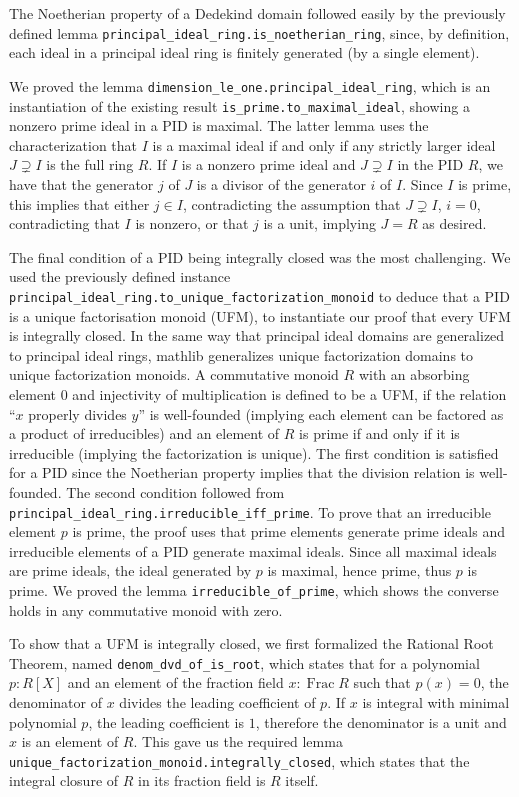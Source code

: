 \documentclass[a4paper,USenglish,cleveref, autoref, thm-restate]{lipics-v2021}
\newcommand{\lean}[1]{\texttt{#1}\xspace}
\newcommand{\mathlib}{\textsf{mathlib}\xspace}
\DeclareMathOperator{\Frac}{Frac}
\begin{document}
The Noetherian property of a Dedekind domain followed easily by the previously defined lemma \lean{principal\_ideal\_ring.is\_noetherian\_ring}, since, by definition, each ideal in a principal ideal ring is finitely generated (by a single element).

We proved the lemma \lean{dimension\_le\_one.principal\_ideal\_ring}, which is an instantiation of the existing result \lean{is\_prime.to\_maximal\_ideal}, showing a nonzero prime ideal in a PID is maximal.
The latter lemma uses the characterization that $I$ is a maximal ideal if and only if any strictly larger ideal $J\supsetneq I$ is the full ring $R$.
If $I$ is a nonzero prime ideal and $J \supsetneq I$ in the PID $R$, we have that the generator $j$ of $J$ is a divisor of the generator $i$ of $I$. Since $I$ is prime, this implies that either $j \in I$, contradicting the assumption that $J \supsetneq I$, $i = 0$, contradicting that $I$ is nonzero, or that $j$ is a unit, implying $J = R$ as desired.

The final condition of a PID being integrally closed was the most challenging.
We used the previously defined instance \lean{principal\_ideal\_ring.to\_unique\_factorization\_monoid} to deduce that a PID is a unique factorisation monoid (UFM),
to instantiate our proof that every UFM is integrally closed.
In the same way that principal ideal domains are generalized to principal ideal rings, \mathlib generalizes unique factorization domains to unique factorization monoids.
A commutative monoid $R$ with an absorbing element $0$ and injectivity of multiplication is defined to be a UFM,
if the relation ``$x$ properly divides $y$'' is well-founded (implying each element can be factored as a product of irreducibles) and
an element of $R$ is prime if and only if it is irreducible (implying the factorization is unique).
The first condition is satisfied for a PID since the Noetherian property implies that the division relation is well-founded.
The second condition followed from \lean{principal\_ideal\_ring.irreducible\_iff\_prime}.
To prove that an irreducible element $p$ is prime, the proof uses that prime elements generate prime ideals and irreducible elements of a PID generate maximal ideals. Since all maximal ideals are prime ideals, the ideal generated by $p$ is maximal, hence prime, thus $p$ is prime.
We proved the lemma \lean{irreducible\_of\_prime}, which shows the converse holds in any commutative monoid with zero.

To show that a UFM is integrally closed, we first formalized the Rational Root Theorem, named \lean{denom\_dvd\_of\_is\_root},
which states that for a polynomial $p : R[X]$ and an element of the fraction field $x : \Frac R$ such that $p(x) = 0$, the denominator of $x$ divides the leading coefficient of $p$.
If $x$ is integral with minimal polynomial $p$, the leading coefficient is $1$, therefore the denominator is a unit and $x$ is an element of $R$.
This gave us the required lemma \lean{unique\_factorization\_monoid.integrally\_closed}, which states that the integral closure of $R$ in its fraction field is $R$ itself.
\end{document}
